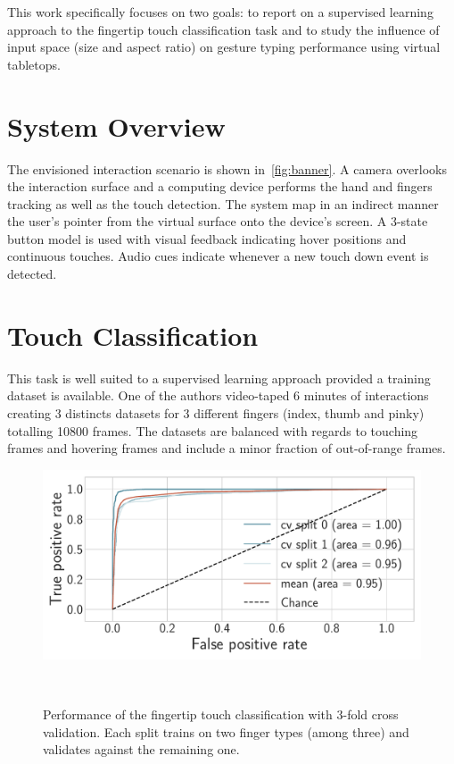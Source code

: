 \documentclass{chi-ext}
\begin{document}
This work specifically focuses on two goals: to report on a supervised learning approach to the fingertip touch classification task and to study the influence of input space (size and aspect ratio) on gesture typing performance using virtual tabletops.

\section{System Overview}
The envisioned interaction scenario is shown in~\autoref{fig:banner}. A camera overlooks the interaction surface and a computing device performs the hand and fingers tracking as well as the touch detection. The system map in an indirect manner the user's pointer from the virtual surface onto the device's screen. A 3-state button model is used with visual feedback indicating hover positions and continuous touches. Audio cues indicate whenever a new touch down event is detected.


\section{Touch Classification}
This task is well suited to a supervised learning approach provided a training dataset is available. One of the authors video-taped 6 minutes of interactions creating 3 distincts datasets for 3 different fingers (index, thumb and pinky) totalling 10800 frames. The datasets are balanced with regards to touching frames and hovering frames and include a minor fraction of out-of-range frames.

\begin{figure}
  \centering
  \includegraphics[width=\linewidth]{figures/roc_auc.pdf}
    \caption{Performance of the fingertip touch classification with 3-fold cross validation. Each split trains on two finger types (among three) and validates against the remaining one.}~\label{fig:roc_auc}
\end{figure}
\end{document}
